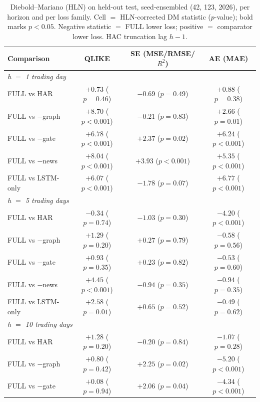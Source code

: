 \documentclass[runningheads]{llncs}
\begin{document}
\begin{table}[t]
\caption{Diebold--Mariano (HLN) on held-out test, seed-ensembled (42, 123, 2026), per horizon and per loss
family. Cell $=$ HLN-corrected DM statistic ($p$-value); bold marks $p<0.05$. Negative statistic $=$ FULL
lower loss; positive $=$ comparator lower loss. HAC truncation lag $h{-}1$.}
\label{tab:dm}
\centering
\begin{tabular}{lccc}
\toprule
Comparison & QLIKE & SE (MSE/RMSE/$R^2$) & AE (MAE) \\
\midrule
\multicolumn{4}{l}{\emph{h $=$ 1 trading day}} \\
FULL vs HAR       & $+0.73$ (\(p=0.46\)) & $-0.69$ (\(p=0.49\)) & $+0.88$ (\(p=0.38\)) \\
FULL vs $-$graph  & $\mathbf{+8.70}$ (\(p<0.001\)) & $-0.21$ (\(p=0.83\)) & $\mathbf{+2.66}$ (\(p=0.01\)) \\
FULL vs $-$gate   & $\mathbf{+6.78}$ (\(p<0.001\)) & $\mathbf{+2.37}$ (\(p=0.02\)) & $\mathbf{+6.24}$ (\(p<0.001\)) \\
FULL vs $-$news   & $\mathbf{+8.04}$ (\(p<0.001\)) & $\mathbf{+3.93}$ (\(p<0.001\)) & $\mathbf{+5.35}$ (\(p<0.001\)) \\
FULL vs LSTM-only & $\mathbf{+6.07}$ (\(p<0.001\)) & $-1.78$ (\(p=0.07\)) & $\mathbf{+6.77}$ (\(p<0.001\)) \\
\midrule
\multicolumn{4}{l}{\emph{h $=$ 5 trading days}} \\
FULL vs HAR       & $-0.34$ (\(p=0.74\)) & $-1.03$ (\(p=0.30\)) & $\mathbf{-4.20}$ (\(p<0.001\)) \\
FULL vs $-$graph  & $+1.29$ (\(p=0.20\)) & $+0.27$ (\(p=0.79\)) & $-0.58$ (\(p=0.56\)) \\
FULL vs $-$gate   & $+0.93$ (\(p=0.35\)) & $+0.23$ (\(p=0.82\)) & $-0.53$ (\(p=0.60\)) \\
FULL vs $-$news   & $\mathbf{+4.45}$ (\(p<0.001\)) & $-0.94$ (\(p=0.35\)) & $-0.94$ (\(p=0.35\)) \\
FULL vs LSTM-only & $\mathbf{+2.58}$ (\(p=0.01\)) & $+0.65$ (\(p=0.52\)) & $-0.49$ (\(p=0.62\)) \\
\midrule
\multicolumn{4}{l}{\emph{h $=$ 10 trading days}} \\
FULL vs HAR       & $+1.28$ (\(p=0.20\)) & $-0.20$ (\(p=0.84\)) & $-1.07$ (\(p=0.28\)) \\
FULL vs $-$graph  & $+0.80$ (\(p=0.42\)) & $\mathbf{+2.25}$ (\(p=0.02\)) & $\mathbf{-5.20}$ (\(p<0.001\)) \\
FULL vs $-$gate   & $+0.08$ (\(p=0.94\)) & $\mathbf{+2.06}$ (\(p=0.04\)) & $\mathbf{-4.34}$ (\(p<0.001\)) \\

\end{tabular}
\end{table}
\end{document}
